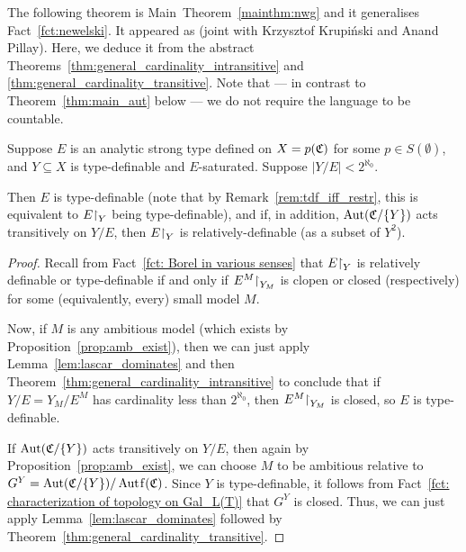 	
	The following theorem is Main~Theorem~\ref{mainthm:nwg} and it generalises Fact~\ref{fct:newelski}. It appeared as \cite[Theorem 5.1]{KPR15} (joint with Krzysztof Krupiński and Anand Pillay). Here, we deduce it from the abstract Theorems~\ref{thm:general_cardinality_intransitive} and \ref{thm:general_cardinality_transitive}. Note that --- in contrast to Theorem~\ref{thm:main_aut} below --- we do not require the language to be countable.
	\begin{thm}
		\label{thm:nwg}
		Suppose $E$ is an analytic strong type defined on $X=p({\mathfrak C})$ for some $p\in S(\emptyset)$, and $Y\subseteq X$ is type-definable and $E$-saturated. Suppose $\lvert Y/E\rvert<2^{\aleph_0}$.
		
		Then $E$ is type-definable (note that by Remark~\ref{rem:tdf_iff_restr}, this is equivalent to $E\mathord{\upharpoonright}_Y$ being type-definable), and if, in addition, $\operatorname{{Aut}}({\mathfrak C}/\{Y\})$ acts transitively on $Y/E$, then $E\mathord{\upharpoonright}_Y$ is relatively-definable (as a subset of $Y^2$).
	\end{thm}
	\begin{proof}
		Recall from Fact~\ref{fct: Borel in various senses} that $E\mathord{\upharpoonright}_Y$ is relatively definable or type-definable if and only if $E^M\mathord{\upharpoonright}_{Y_M}$ is clopen or closed (respectively) for some (equivalently, every) small model $M$.
		
		Now, if $M$ is any ambitious model (which exists by Proposition~\ref{prop:amb_exist}), then we can just apply Lemma~\ref{lem:lascar_dominates} and then Theorem~\ref{thm:general_cardinality_intransitive} to conclude that if $Y/E=Y_M/{E^M}$ has cardinality less than $2^{\aleph_0}$, then $E^M\mathord{\upharpoonright}_{Y_M}$ is closed, so $E$ is type-definable.
		
		If $\operatorname{{Aut}}({\mathfrak C}/\{Y\})$ acts transitively on $Y/E$, then again by Proposition~\ref{prop:amb_exist}, we can choose $M$ to be ambitious relative to $G^Y=\Aut(\fC/\{Y\})/\Autf(\fC)$. Since $Y$ is type-definable, it follows from Fact~\ref{fct: characterization of topology on Gal_L(T)} that $G^Y$ is closed. Thus, we can just apply Lemma~\ref{lem:lascar_dominates} followed by Theorem~\ref{thm:general_cardinality_transitive}.
	\end{proof}
	
